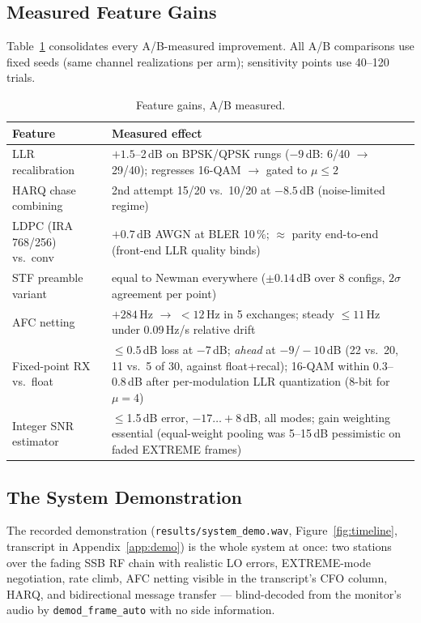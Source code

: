 \subsection{Measured Feature Gains}

Table~\ref{tab:gains} consolidates every A/B-measured improvement.
All A/B comparisons use fixed seeds (same channel realizations per
arm); sensitivity points use 40--120 trials.

\begin{table}[H]
    \centering
    \caption{Feature gains, A/B measured.}
    \label{tab:gains}
    \small
    \begin{tabular}{@{}p{4.6cm}p{9.6cm}@{}}
    \toprule
    \textbf{Feature} & \textbf{Measured effect} \\
    \midrule
    LLR recalibration & $+1.5$--2\,dB on BPSK/QPSK rungs ($-9$\,dB:
        6/40 $\to$ 29/40); regresses 16-QAM $\to$ gated to
        $\mu \le 2$ \\
    HARQ chase combining & 2nd attempt 15/20 vs.\ 10/20 at
        $-8.5$\,dB (noise-limited regime) \\
    LDPC (IRA 768/256) vs.\ conv & $+0.7$\,dB AWGN at BLER 10\,\%;
        $\approx$ parity end-to-end (front-end LLR quality binds) \\
    STF preamble variant & equal to Newman everywhere ($\pm 0.14$\,dB
        over 8 configs, $2\sigma$ agreement per point) \\
    AFC netting & $+284$\,Hz $\to$ $<12$\,Hz in 5 exchanges; steady
        $\le 11$\,Hz under 0.09\,Hz/s relative drift \\
    Fixed-point RX vs.\ float & $\le 0.5$\,dB loss at $-7$\,dB;
        \emph{ahead} at $-9/-10$\,dB (22 vs.\ 20, 11 vs.\ 5 of 30,
        against float+recal); 16-QAM within 0.3--0.8\,dB after
        per-modulation LLR quantization (8-bit for $\mu = 4$) \\
    Integer SNR estimator & $\le$1.5\,dB error, $-17\ldots+8$\,dB, all
        modes; gain weighting essential (equal-weight pooling was
        5--15\,dB pessimistic on faded EXTREME frames) \\
    \bottomrule
    \end{tabular}
\end{table}

\subsection{The System Demonstration}

The recorded demonstration (\texttt{results/system\_demo.wav},
Figure~\ref{fig:timeline}, transcript in Appendix~\ref{app:demo}) is
the whole system at once: two stations over the fading SSB RF chain
with realistic LO errors, EXTREME-mode negotiation, rate climb,
AFC netting visible in the transcript's CFO column, HARQ, and
bidirectional message transfer --- blind-decoded from the monitor's
audio by \texttt{demod\_frame\_auto} with no side information.


